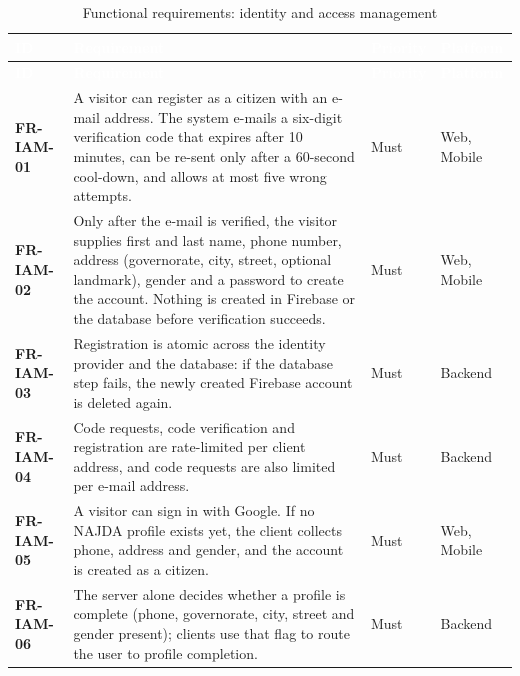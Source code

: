 {\tabfont\rowband
\begin{longtable}{@{}>{\raggedright\arraybackslash}p{}>{\raggedright\arraybackslash}p{}>{\raggedright\arraybackslash}p{}>{\raggedright\arraybackslash}p{}@{}}
\caption{Functional requirements: identity and access management}\label{tab:fr-iam}\\
\rowcolor{najdanavy}\textcolor{white}{\sffamily\bfseries\small ID} & \textcolor{white}{\sffamily\bfseries\small Requirement} & \textcolor{white}{\sffamily\bfseries\small Priority} & \textcolor{white}{\sffamily\bfseries\small Platform}\\
\endfirsthead
\rowcolor{najdanavy}\textcolor{white}{\sffamily\bfseries\small ID} & \textcolor{white}{\sffamily\bfseries\small Requirement} & \textcolor{white}{\sffamily\bfseries\small Priority} & \textcolor{white}{\sffamily\bfseries\small Platform}\\
\endhead
\bottomrule\endlastfoot
\textbf{FR-IAM-01} & A visitor can register as a citizen with an e-mail address. The system e-mails a six-digit verification code that expires after 10 minutes, can be re-sent only after a 60-second cool-down, and allows at most five wrong attempts. & Must & Web, Mobile\\
\textbf{FR-IAM-02} & Only after the e-mail is verified, the visitor supplies first and last name, phone number, address (governorate, city, street, optional landmark), gender and a password to create the account. Nothing is created in Firebase or the database before verification succeeds. & Must & Web, Mobile\\
\textbf{FR-IAM-03} & Registration is atomic across the identity provider and the database: if the database step fails, the newly created Firebase account is deleted again. & Must & Backend\\
\textbf{FR-IAM-04} & Code requests, code verification and registration are rate-limited per client address, and code requests are also limited per e-mail address. & Must & Backend\\
\textbf{FR-IAM-05} & A visitor can sign in with Google. If no NAJDA profile exists yet, the client collects phone, address and gender, and the account is created as a citizen. & Must & Web, Mobile\\
\textbf{FR-IAM-06} & The server alone decides whether a profile is complete (phone, governorate, city, street and gender present); clients use that flag to route the user to profile completion. & Must & Backend\\

\end{longtable}}
